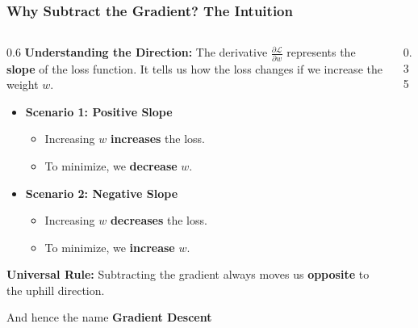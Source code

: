 \documentclass[5pt,aspectratio=169]{beamer}
\begin{document}
\begin{frame}
\frametitle{Why Subtract the Gradient? The Intuition}

\begin{columns}[T]
\begin{column}{0.6\textwidth}
\textbf{Understanding the Direction:}
The derivative $\frac{\partial \mathcal{L}}{\partial w}$ represents the \textbf{slope} of the loss function. It tells us how the loss changes if we increase the weight $w$.

\begin{itemize}
    \item \textbf{Scenario 1: Positive Slope}
    \begin{itemize}
        \item Increasing $w$ \textbf{increases} the loss.
        \item To minimize, we \textbf{decrease} $w$. 
    \end{itemize}
    \item \textbf{Scenario 2: Negative Slope}
    \begin{itemize}
        \item Increasing $w$ \textbf{decreases} the loss.
        \item To minimize, we \textbf{increase} $w$.
    \end{itemize}
\end{itemize}

\textbf{Universal Rule:}
Subtracting the gradient always moves us \textbf{opposite} to the uphill direction.

And hence the name \textbf{Gradient Descent}
\end{column}

\begin{column}{0.35\textwidth}
\centering
{}
\end{column}
\end{columns}

\end{frame}
\end{document}
